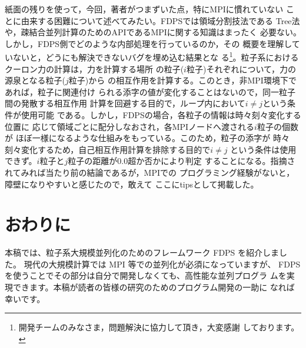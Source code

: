 \documentclass{jspf}            %
\begin{document}
紙面の残りを使って，今回，著者がつまずいた点，特にMPIに慣れていない
ことに由来する困難について述べてみたい。FDPSでは領域分割技法である
Tree法や，疎結合並列計算のためのAPIであるMPIに関する知識はまったく
必要ない。しかし，FDPS側でどのような内部処理を行っているのか，その
概要を理解していないと，どうにも解決できないバグを埋め込む結果とな
る\footnote{開発チームのみなさま，問題解決に協力して頂き，大変感謝
しております。}。粒子系におけるクーロン力の計算は，力を計算する場所
の粒子($i$粒子)それぞれについて，力の源泉となる粒子($j$粒子)から
の相互作用を計算する。このとき，非MPI環境下であれば，粒子に関連付け
られる添字の値が変化することはないので，同一粒子間の発散する相互作用
計算を回避する目的で，ループ内において$i\neq j$という条件が使用可能
である。しかし，FDPSの場合，各粒子の情報は時々刻々変化する位置に
応じて領域ごとに配分しなおされ，各MPIノードへ渡される$i$粒子の個数が
ほぼ一様になるような仕組みをもっている。このため，粒子の添字が
時々刻々変化するため，自己相互作用計算を排除する目的で$i \neq j$
という条件は使用できず。$i$粒子と$j$粒子の距離が0.0超か否かにより判定
することになる。指摘されてみれば当たり前の結論であるが，MPIでの
プログラミング経験がないと，障壁になりやすいと感じたので，敢えて
ここにtipsとして掲載した。
\section{おわりに}

本稿では、粒子系大規模並列化のためのフレームワーク FDPS を紹介しました。
現代の大規模計算では MPI 等での並列化が必須になっていますが、
FDPS を使うことでその部分は自分で開発しなくても、高性能な並列プログラ
ムを実現できます。本稿が読者の皆様の研究のためのプログラム開発の一助に
なれば
幸いです。
\end{document}
